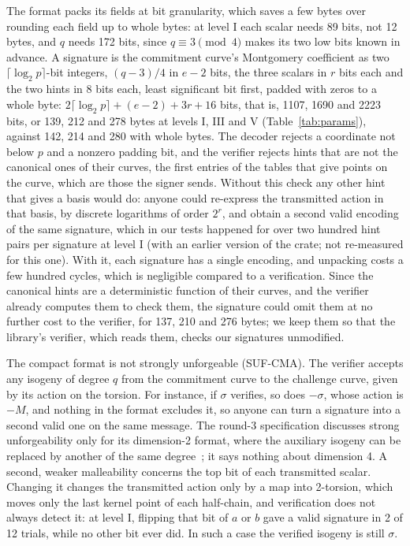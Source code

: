 \documentclass[version=preprint]{iacrcc}
\begin{document}
    The format packs its fields at bit granularity, which saves a few bytes
    over rounding each field up to whole bytes: at level I each scalar needs
    89 bits, not 12 bytes, and $q$ needs 172 bits, since $q \equiv 3 \pmod 4$
    makes its two low bits known in advance. A signature is the commitment
    curve's Montgomery coefficient as two $\lceil \log_2 p \rceil$-bit integers,
    $(q - 3)/4$ in $e - 2$ bits, the three scalars in $r$ bits each and the two
    hints in 8 bits each, least significant bit first, padded with zeros to a
    whole byte: $2 \lceil \log_2 p \rceil + (e - 2) + 3r + 16$ bits, that is,
    1107, 1690 and 2223 bits, or 139, 212 and 278 bytes at levels I, III and V
    (Table~\ref{tab:params}), against 142, 214 and 280 with whole bytes. The
    decoder rejects a coordinate not below $p$ and a nonzero padding bit, and
    the verifier rejects hints that are not the canonical ones of their
    curves, the first entries of the tables that give points on the curve,
    which are those the signer sends. Without this check any other hint that
    gives a basis would do: anyone could re-express the transmitted action in
    that basis, by discrete logarithms of order $2^r$, and obtain a second
    valid encoding of the same signature, which in our tests happened for
    over two hundred hint pairs per signature at level I (with an earlier
    version of the crate; not re-measured for this one). With it, each
    signature has a single encoding, and unpacking costs a few hundred
    cycles, which is negligible compared to a verification. Since the canonical hints are a deterministic function of their curves, and
    the verifier already computes them to check them, the signature could omit
    them at no further cost to the verifier, for 137, 210 and 276 bytes; we
    keep them so that the library's verifier, which reads them, checks our
    signatures unmodified.

    The compact format is not strongly unforgeable (SUF-CMA). The verifier accepts any isogeny of degree $q$ from
    the commitment curve to the challenge curve, given by its action on the
    torsion. For instance, if $\sigma$ verifies, so does $-\sigma$, whose
    action is $-M$, and nothing in the format excludes it, so anyone can turn a
    signature into a second valid one on the same message. The round-3
    specification discusses strong unforgeability only for its dimension-2
    format, where the auxiliary isogeny can be replaced by another of the same
    degree~\cite[Section 8.4.2]{AAA+26}; it says nothing about dimension 4.
    A second, weaker malleability concerns the top bit of each transmitted
    scalar. Changing it changes the transmitted action only by a map into
    2-torsion, which moves only the last kernel point of each half-chain, and
    verification does not always detect it: at level I, flipping that bit of
    $a$ or $b$ gave a valid signature in 2 of 12 trials, while no other bit ever
    did. In such a case the verified isogeny is still $\sigma$.
\end{document}
